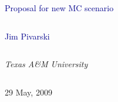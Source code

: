 \documentclass[compress]{beamer}
\begin{document}
\begin{frame}
\vfill
\begin{center}
\textcolor{darkblue}{\Large Proposal for new MC scenario}

\vfill
\begin{columns}
\begin{center}
\large
\textcolor{darkblue}{Jim Pivarski}
\end{center}
\end{columns}

\begin{columns}
\begin{center}
\scriptsize
{\it Texas A\&M University}
\end{center}
\end{columns}

\vfill
29 May, 2009

\end{center}
\end{frame}


\small
\end{document}
